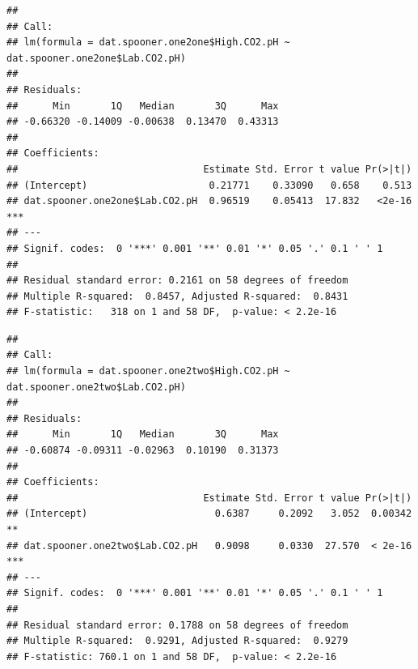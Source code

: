 \documentclass[]{article}
\newenvironment{Shaded}{\begin{snugshade}}{\end{snugshade}}
\newcommand{\KeywordTok}[1]{\textcolor[rgb]{0.13,0.29,0.53}{\textbf{#1}}}
\newcommand{\NormalTok}[1]{#1}
\newcommand{\OperatorTok}[1]{\textcolor[rgb]{0.81,0.36,0.00}{\textbf{#1}}}
\newcommand{\StringTok}[1]{\textcolor[rgb]{0.31,0.60,0.02}{#1}}
\begin{document}
\begin{verbatim}
## 
## Call:
## lm(formula = dat.spooner.one2one$High.CO2.pH ~ dat.spooner.one2one$Lab.CO2.pH)
## 
## Residuals:
##      Min       1Q   Median       3Q      Max 
## -0.66320 -0.14009 -0.00638  0.13470  0.43313 
## 
## Coefficients:
##                                Estimate Std. Error t value Pr(>|t|)    
## (Intercept)                     0.21771    0.33090   0.658    0.513    
## dat.spooner.one2one$Lab.CO2.pH  0.96519    0.05413  17.832   <2e-16 ***
## ---
## Signif. codes:  0 '***' 0.001 '**' 0.01 '*' 0.05 '.' 0.1 ' ' 1
## 
## Residual standard error: 0.2161 on 58 degrees of freedom
## Multiple R-squared:  0.8457, Adjusted R-squared:  0.8431 
## F-statistic:   318 on 1 and 58 DF,  p-value: < 2.2e-16
\end{verbatim}

\begin{Shaded}
\end{Shaded}

\begin{verbatim}
## 
## Call:
## lm(formula = dat.spooner.one2two$High.CO2.pH ~ dat.spooner.one2two$Lab.CO2.pH)
## 
## Residuals:
##      Min       1Q   Median       3Q      Max 
## -0.60874 -0.09311 -0.02963  0.10190  0.31373 
## 
## Coefficients:
##                                Estimate Std. Error t value Pr(>|t|)    
## (Intercept)                      0.6387     0.2092   3.052  0.00342 ** 
## dat.spooner.one2two$Lab.CO2.pH   0.9098     0.0330  27.570  < 2e-16 ***
## ---
## Signif. codes:  0 '***' 0.001 '**' 0.01 '*' 0.05 '.' 0.1 ' ' 1
## 
## Residual standard error: 0.1788 on 58 degrees of freedom
## Multiple R-squared:  0.9291, Adjusted R-squared:  0.9279 
## F-statistic: 760.1 on 1 and 58 DF,  p-value: < 2.2e-16
\end{verbatim}

\begin{Shaded}
\end{Shaded}
\end{document}
